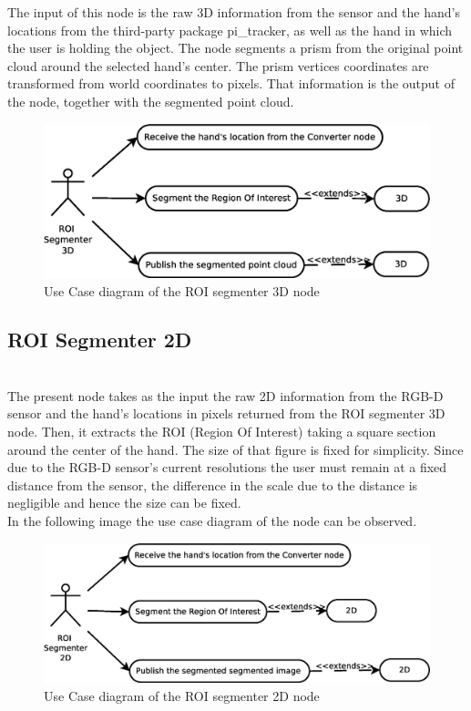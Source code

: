 	The input of this node is the raw 3D information from the sensor and the hand's locations from the third-party package pi\_tracker, as well as the hand in which the user is holding the object. The node segments a prism from the original point cloud around the selected hand's center. The prism vertices coordinates are transformed from world coordinates to pixels. That information is the output of the node, together with the segmented point cloud. 

	\begin{figure}[h]
		\begin{center}
	\includegraphics[scale=0.2]{img/diagrams/uc_roi_segmenter_3d.eps}
		\caption[Use case diagram ROI segmenter 3D node]{Use Case diagram of the ROI segmenter 3D node}
		\end{center}
	\end{figure}
 
\subsection{ROI Segmenter 2D}\\
	\label{roi_segmenter_2d}
	The present node takes as the input the raw 2D information from the RGB-D sensor and the hand's locations in pixels returned from the ROI segmenter 3D node. Then, it extracts the ROI (Region Of Interest) taking a square section around the center of the hand. The size of that figure is fixed for simplicity. Since due to the RGB-D sensor's current resolutions the user must remain at a fixed distance from the sensor, the difference in the scale due to the distance is negligible and hence the size can be fixed. 
	\\

	In the following image the use case diagram of the node can be observed.
	\begin{figure}[h]
		\begin{center}
			\includegraphics[scale=0.2]{img/diagrams/uc_roi_segmenter_2d.eps}
			\caption[Use case diagram ROI segmenter 2D node]{Use Case diagram of the ROI segmenter 2D node}
		\end{center}
	\end{figure}


